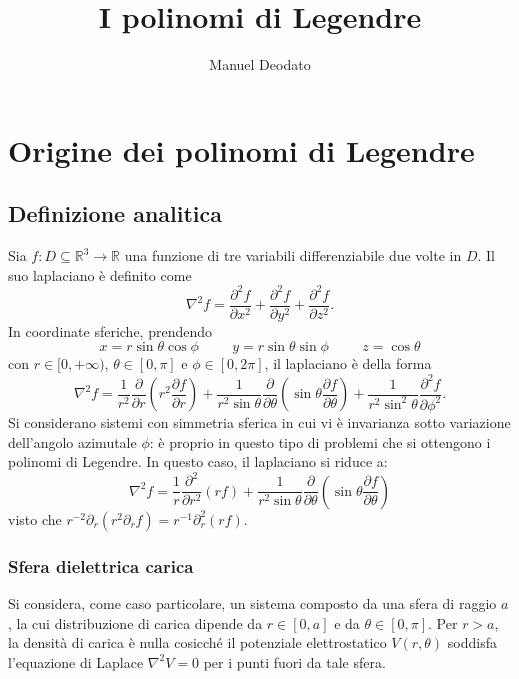 \documentclass[11pt, a4paper]{scrartcl}
\title{I polinomi di Legendre}
\author{Manuel Deodato}
\date{}
\theoremstyle{definition}
\numberwithin{esempio}{section}
\theoremstyle{definition}
\numberwithin{obs}{section}
\numberwithin{nota}{section}
\renewcommand{\maketitle}{
\begin{center}
{\sffamily
{\fontsize{20}{20}\selectfont\MakeUppercase\thetitle}}

\vspace{0.2in}

{\large\scshape\sffamily\theauthor}
\end{center}
}
\numberwithin{equation}{subsection}
\begin{document}
\maketitle
\tableofcontents 
\newpage
\section{Origine dei polinomi di Legendre}
\subsection{Definizione analitica}


Sia $f:D \subseteq \mathbb{R}^3 \to \mathbb{R}$ una funzione di tre variabili differenziabile due volte in $D$.
Il suo laplaciano \`e definito come
\[
\nabla ^2 f = \frac{\partial ^2 f}{\partial x^2} + \frac{\partial ^2 f}{\partial y^2} + \frac{\partial ^2 f}{\partial z^2} .
\] 
In coordinate sferiche, prendendo
\[
	x = r \sin \theta \cos \phi \hspace{1cm} y = r \sin \theta  \sin \phi \hspace{1cm} z = \cos \theta 
\] 
con $r \in [0,+\infty)$, $\theta \in \left[ 0,\pi \right]$ e $\phi \in \left[ 0,2\pi \right] $, il laplaciano \`e della forma
\begin{equation}
	\nabla ^2 f = \frac{1}{r^2} \frac{\partial }{\partial r} \left(r^2 \frac{\partial f}{\partial r} \right) + \frac{1}{r^2 \sin \theta }\frac{\partial }{\partial \theta } \left(\sin \theta  \frac{\partial f}{\partial \theta } \right) + \frac{1}{r^2 \sin ^2 \theta }\frac{\partial ^2f}{\partial \phi ^2} .
\end{equation}
Si considerano sistemi con simmetria sferica in cui vi \`e invarianza sotto variazione dell'angolo azimutale $\phi $: \`e proprio in questo tipo di problemi che si ottengono i polinomi di Legendre.
In questo caso, il laplaciano si riduce a:
\begin{equation}
	\nabla ^2 f = \frac{1}{r}\frac{\partial ^2}{\partial r^2} (rf) + \frac{1}{r^2 \sin \theta }\frac{\partial }{\partial \theta } \left(\sin \theta \frac{\partial f}{\partial \theta }  \right) 
\end{equation}
visto che $r^{-2} \partial _r(r^2  \partial _r f) = r^{-1} \partial ^2_r (rf)$.
\subsubsection{Sfera dielettrica carica}

Si considera, come caso particolare, un sistema composto da una sfera di raggio $a$, la cui distribuzione di carica dipende da $r \in \left[ 0,a \right] $ e da $\theta \in \left[ 0,\pi \right] $. 
Per $r>a$, la densit\`a di carica \`e nulla cosicch\'e il potenziale elettrostatico $V(r,\theta )$ soddisfa l'equazione di Laplace $\nabla ^2 V = 0$ per i punti fuori da tale sfera.
\end{document}
